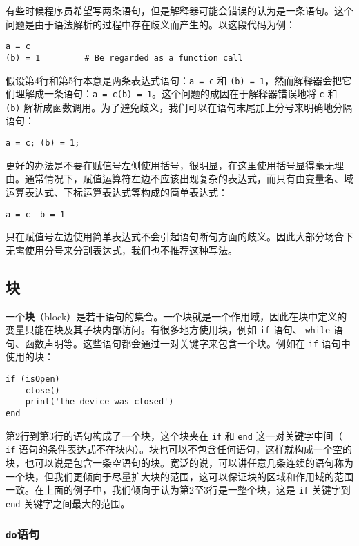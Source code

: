 有些时候程序员希望写两条语句，但是解释器可能会错误的认为是一条语句。这个问题是由于语法解析的过程中存在歧义而产生的。以这段代码为例：
\begin{lstlisting}[language=berry, numbers=none]
a = c
(b) = 1         # Be regarded as a function call
\end{lstlisting}
假设第4行和第5行本意是两条表达式语句：\texttt{a = c} 和 \texttt{(b) = 1}，然而解释器会把它们理解成一条语句：\texttt{a = c(b) = 1}。这个问题的成因在于解释器错误地将 \texttt{c} 和 \texttt{(b)} 解析成函数调用。为了避免歧义，我们可以在语句末尾加上分号来明确地分隔语句：
\begin{lstlisting}[language=berry, numbers=none]
a = c; (b) = 1;
\end{lstlisting}
更好的办法是不要在赋值号左侧使用括号，很明显，在这里使用括号显得毫无理由。通常情况下，赋值运算符左边不应该出现复杂的表达式，而只有由变量名、域运算表达式、下标运算表达式等构成的简单表达式：
\begin{lstlisting}[language=berry, numbers=none]
a = c  b = 1
\end{lstlisting}
只在赋值号左边使用简单表达式不会引起语句断句方面的歧义。因此大部分场合下无需使用分号来分割表达式，我们也不推荐这种写法。

\subsection{块} \label{section:block}

一个\textbf{块}（block）是若干语句的集合。一个块就是一个作用域，因此在块中定义的变量只能在块及其子块内部访问。有很多地方使用块，例如 \texttt{if} 语句、 \texttt{while} 语句、函数声明等。这些语句都会通过一对关键字来包含一个块。例如在 \texttt{if} 语句中使用的块：
\begin{lstlisting}[language=berry]
if (isOpen)
    close()
    print('the device was closed')
end
\end{lstlisting}
第2行到第3行的语句构成了一个块，这个块夹在 \texttt{if} 和 \texttt{end} 这一对关键字中间（ \texttt{if} 语句的条件表达式不在块内）。块也可以不包含任何语句，这样就构成一个空的块，也可以说是包含一条空语句的块。宽泛的说，可以讲任意几条连续的语句称为一个块，但我们更倾向于尽量扩大块的范围，这可以保证块的区域和作用域的范围一致。在上面的例子中，我们倾向于认为第2至3行是一整个块，这是 \texttt{if} 关键字到 \texttt{end} 关键字之间最大的范围。

\subsubsection{\texttt{do}语句}

